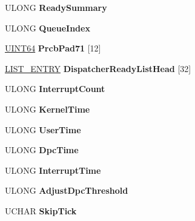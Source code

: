 \begin{DoxyCompactItemize}
U\+L\+O\+NG {\bfseries Ready\+Summary}
\item 
\mbox{\label{struct___k_p_r_c_b_a366b6f4504ac4a2da543d1f8ad7367f9}} 
U\+L\+O\+NG {\bfseries Queue\+Index}
\item 
\mbox{\label{struct___k_p_r_c_b_a21466a7addb071ed97f8dff74d6aac79}} 
\hyperlink{_processor_bind_8h_a57be03562867144161c1bfee95ca8f7c}{U\+I\+N\+T64} {\bfseries Prcb\+Pad71} \mbox{[}12\mbox{]}
\item 
\mbox{\label{struct___k_p_r_c_b_ae3a76f247adf464a576528817a901c1f}} 
\hyperlink{struct___l_i_s_t___e_n_t_r_y}{L\+I\+S\+T\+\_\+\+E\+N\+T\+RY} {\bfseries Dispatcher\+Ready\+List\+Head} \mbox{[}32\mbox{]}
\item 
\mbox{\label{struct___k_p_r_c_b_a3c8938609c922236aa4128e8751e9bbf}} 
U\+L\+O\+NG {\bfseries Interrupt\+Count}
\item 
\mbox{\label{struct___k_p_r_c_b_ac6d92db50a756befabe4b73fc2b377ef}} 
U\+L\+O\+NG {\bfseries Kernel\+Time}
\item 
\mbox{\label{struct___k_p_r_c_b_a1bf1b8207eea0b5d270fe89feaefad16}} 
U\+L\+O\+NG {\bfseries User\+Time}
\item 
\mbox{\label{struct___k_p_r_c_b_a704b0c2fbffaa8705f9194831767380e}} 
U\+L\+O\+NG {\bfseries Dpc\+Time}
\item 
\mbox{\label{struct___k_p_r_c_b_a16940bde54c00505be875f6cf50ac3ca}} 
U\+L\+O\+NG {\bfseries Interrupt\+Time}
\item 
\mbox{\label{struct___k_p_r_c_b_a960c8b237b2fd3853d501a652a46fc8d}} 
U\+L\+O\+NG {\bfseries Adjust\+Dpc\+Threshold}
\item 
\mbox{\label{struct___k_p_r_c_b_a4c8b8a4abb4850eec351d3cbda593b37}} 
U\+C\+H\+AR {\bfseries Skip\+Tick}
\item 
\mbox{\label{struct___k_p_r_c_b_af8dbb19038d7d23bd80fd08a3fcd67e7}} 

\end{DoxyCompactItemize}
